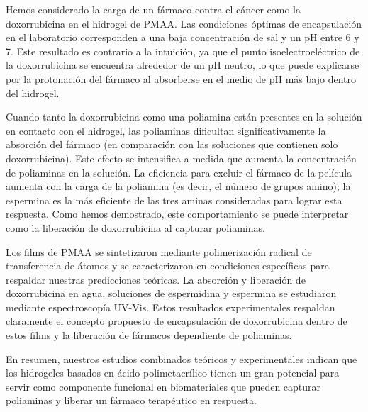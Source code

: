 Hemos considerado la carga de un f\'armaco contra el c\'ancer como la doxorrubicina en el hidrogel de PMAA. Las condiciones \'optimas de encapsulaci\'on en el laboratorio corresponden a una baja concentraci\'on de sal y un pH entre 6 y 7. Este resultado es contrario a la intuici\'on, ya que el punto isoelectroel\'ectrico de la doxorrubicina se encuentra alrededor de un pH neutro, lo que puede explicarse por la protonaci\'on del f\'armaco al absorberse en el medio de pH m\'as bajo dentro del hidrogel.

Cuando tanto la doxorrubicina como una poliamina est\'an presentes en la soluci\'on en contacto con el hidrogel, las poliaminas dificultan significativamente la absorci\'on del f\'armaco (en comparaci\'on con las soluciones que contienen solo doxorrubicina). Este efecto se intensifica a medida que aumenta la concentraci\'on de poliaminas en la soluci\'on. La eficiencia para excluir el f\'armaco de la pel\'icula aumenta con la carga de la poliamina (es decir, el n\'umero de grupos amino); la espermina es la m\'as eficiente de las tres aminas consideradas para lograr esta respuesta. Como hemos demostrado, este comportamiento se puede interpretar como la liberaci\'on de doxorrubicina al capturar poliaminas.

Los films  de PMAA se sintetizaron mediante polimerizaci\'on radical de transferencia de \'atomos y se caracterizaron en condiciones espec\'ificas para respaldar nuestras predicciones te\'oricas. La absorci\'on y liberaci\'on de doxorrubicina en agua, soluciones de espermidina y espermina se estudiaron mediante espectroscopía UV-Vis. Estos resultados experimentales respaldan claramente el concepto propuesto de encapsulaci\'on de doxorrubicina dentro de estos films y la liberaci\'on de f\'armacos dependiente de poliaminas. %

En resumen, nuestros estudios combinados te\'oricos y experimentales indican que los hidrogeles basados en \'acido polimetacr\'ilico tienen un gran potencial para servir como componente funcional en biomateriales que pueden capturar poliaminas y liberar un f\'armaco terap\'eutico en respuesta.